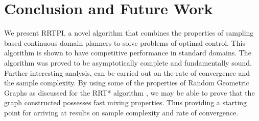 \documentclass[wcp]{jmlr}
\begin{document}
\section{Conclusion and Future Work}
We present RRTPI, a novel algorithm that combines the properties of sampling based continuous domain planners to solve problems of optimal control. This algorithm is shown to have competitive performance in standard domains.  The algorithm was proved to be asymptotically complete and fundamentally sound.  Further interesting analysis, can be carried out on the rate of convergence and the sample complexity. By using some of the properties of Random Geometric Graphs as discussed for the RRT* algorithm \citep{karaman}, we may be able to prove that the graph constructed possesses fast mixing properties. Thus providing a starting point for arriving at results on sample complexity and rate of convergence. 


\end{document}
